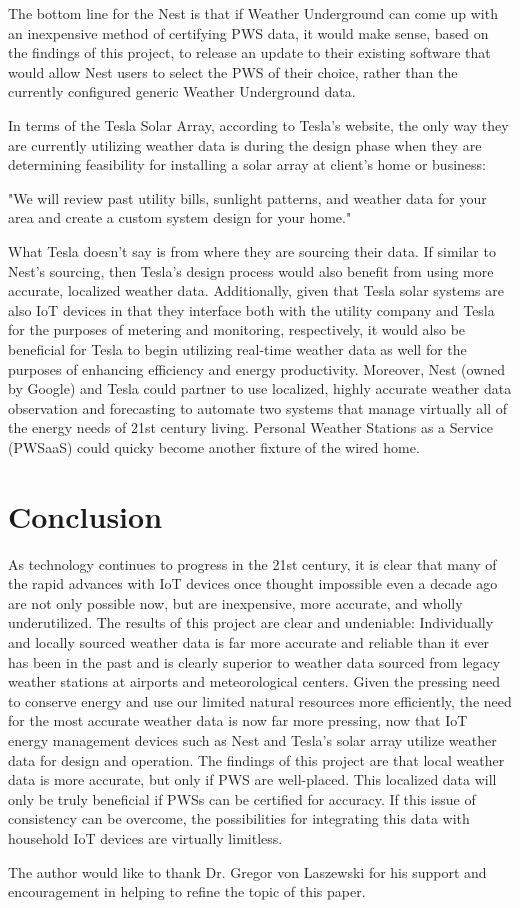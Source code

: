 \documentclass[sigconf]{acmart}
\begin{document}
The bottom line for the Nest is that if Weather Underground can come up with an inexpensive method of certifying PWS data, it would make sense, based on the findings of this project, to release an update to their existing software that would allow Nest users to select the PWS of their choice, rather than the currently configured generic Weather Underground data. 

In terms of the Tesla Solar Array, according to Tesla's website, the only way they are currently utilizing weather data is during the design phase when they are determining feasibility for installing a solar array at client's home or business\cite{Tesla2017}:

\textquote "We will review past utility bills, sunlight patterns, and weather data for your area and create a custom system design for your home."

What Tesla doesn't say is from where they are sourcing their data. If similar to Nest's sourcing, then Tesla's design process would also benefit from using more accurate, localized weather data. Additionally, given that Tesla solar systems are also IoT devices in that they interface both with the utility company and Tesla for the purposes of metering and monitoring, respectively, it would also be beneficial for Tesla to begin utilizing real-time weather data as well for the purposes of enhancing efficiency and energy productivity. Moreover, Nest (owned by Google) and Tesla could partner to use localized, highly accurate weather data observation and forecasting to automate two systems that manage virtually all of the energy needs of 21st century living. Personal Weather Stations as a Service (PWSaaS) could quicky become another fixture of the wired home.

\section{Conclusion}

As technology continues to progress in the 21st century, it is clear that many of the rapid advances with IoT devices once thought impossible even a decade ago are not only possible now, but are inexpensive, more accurate, and wholly underutilized. The results of this project are clear and undeniable: Individually and locally sourced weather data is far more accurate and reliable than it ever has been in the past and is clearly superior to weather data sourced from legacy weather stations at airports and meteorological centers. Given the pressing need to conserve energy and use our limited natural resources more efficiently, the need for the most accurate weather data is now far more pressing, now that IoT energy management devices such as Nest and Tesla's solar array utilize weather data for design and operation. The findings of this project are that local weather data is more accurate, but only if PWS are well-placed. This localized data will only be truly beneficial if PWSs can be certified for accuracy. If this issue of consistency can be overcome, the possibilities for integrating this data with household IoT devices are virtually limitless.

\begin{acks}

The author would like to thank Dr. Gregor von Laszewski for his support and encouragement in helping to refine the topic of this paper.

\end{acks}


 
\end{document}
